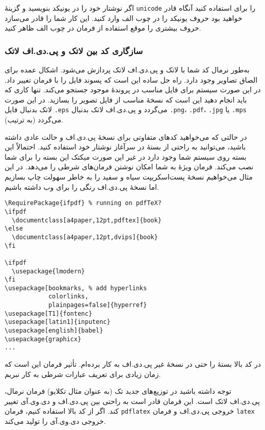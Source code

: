 {اگر نوشتار‌ خود را در یونیکد بنویسید و گزینهٔ \verb+unicode+ را برای   استفاده کنید آنگاه قادر خواهید بود حروف یونیکد را در چوب الف وارد کنید. این کار شما را قادر می‌سازد حروف بیشتری را موقع استفاده از فرمان   در چوب الف ظاهر کنید.

\subsubsection{سازگاری کد بین لاتک و پی.دی.اف لاتک}
\label{sec:pdfcompat}

به‌طور نرمال کد شما با لاتک و پی.دی.اف لاتک پردازش می‌شود. اشکال عمده برای الصاق تصاویر وجود دارد. راه حل ساده این است که  پسوند فایل را با فرمان   تغییر داد. در این صورت سیستم برای فایل مناسب در پروندهٔ موجود جستجو می‌کند. تنها کاری که باید انجام دهید این است که نسخهٔ مناسب از فایل تصویر را بسازید. در این صورت لاتک بدنبال فایل  \texttt{.eps} می‌گردد و پی.دی.اف لاتک بدنبال 
\texttt{.png}، \texttt{.pdf}، \texttt{.jpg} یا \texttt{.mps} می‌گردد 
(به ترتیب).

در حالتی که می‌خواهید کدهای متفاوتی برای نسخهٔ پی.دی.اف و حالت عادی داشته باشید، می‌توانید به راحتی از بستهٔ %
     در سرآغاز نوشتار‌ خود استفاده کنید.
احتمالاً این بسته روی سیستم شما وجود دارد در غیر این صورت میکتک این بسته را برای شما نصب می‌کند. فرمان ویژهٔ   به شما امکان نوشتن فرمان‌های شرطی را می‌دهد. در این مثال می‌خواهیم نسخهٔ پست‌اسکریپت سیاه و سفید را به خاطر سهولت چاپ بسازیم اما نسخهٔ پی.دی.اف رنگی را برای وب داشته باشیم.
\begin{code}
\begin{verbatim}
\RequirePackage{ifpdf} % running on pdfTeX?
\ifpdf
  \documentclass[a4paper,12pt,pdftex]{book}
\else
  \documentclass[a4paper,12pt,dvips]{book}
\fi

\ifpdf
  \usepackage{lmodern}
\fi
\usepackage[bookmarks, % add hyperlinks
            colorlinks,
            plainpages=false]{hyperref}                    
\usepackage[T1]{fontenc}
\usepackage[latin1]{inputenc}
\usepackage[english]{babel}
\usepackage{graphicx}
...
\end{verbatim}
\end{code}
در کد بالا بستهٔ   را حتی در نسخهٔ غیر پی.دی.اف به کار برده‌ام. تأثیر فرمان   این است که زمان زیادی برای تعریف عبارات شرطی به کار نبریم.

توجه داشته باشید در توزیع‌های جدید تک 
(به عنوان مثال تکلایو)
فرمان نرمال، پی.دی.اف لاتک است. این فرمان قادر است به راحتی بین پی.دی.اف و دی.وی.آی تغییر کند. اگر از کد بالا استفاده کنیم، فرمان  \verb|pdflatex|
خروجی پی.دی.اف و فرمان  \verb|latex| خروجی دی.وی.آی را تولید می‌کند.

}
